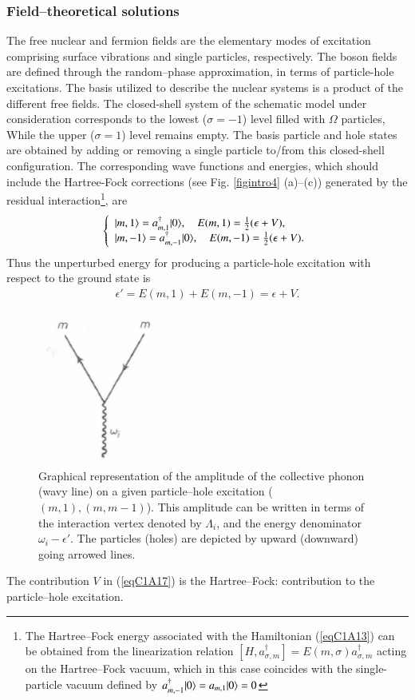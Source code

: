 \subsubsection{Field--theoretical solutions}
 The free nuclear and fermion fields are
the elementary modes of excitation comprising surface vibrations and single
particles, respectively. The boson fields are defined through the random--phase
approximation, in terms of particle-hole excitations. The basis utilized to
describe the nuclear systems is a product of the different free fields. 
The closed-shell system of the schematic model under consideration corresponds to the lowest ($\sigma = - 1$) level filled with $\Omega$ particles, While the upper
($\sigma =  1$) level remains empty. The basis particle and hole states are obtained
by adding or removing a single particle to/from this closed-shell configuration.
The corresponding wave functions and energies, which should include the
Hartree-Fock corrections (see Fig. \ref{figintro4} (a)--(c)) generated by the residual interaction\footnote{The Hartree--Fock energy associated with the Hamiltonian (\ref{eqC1A13}) can be obtained
from the linearization relation $[H,a_{\sigma,m}^\dagger]=E(m,\sigma)a^\dagger_{\sigma,m}$ acting on the Hartree--Fock
vacuum, which in this case coincides with the single-particle vacuum defined by
 $a^\dagger_{m,-1}|{0} \rangle=a_{m,1}|{0} \rangle=0$}, are
 \begin{align}\label{eqC1A17} 
\left\{\begin{array}{l}
 |{m,1} \rangle=a^\dagger_{m,1}|{0} \rangle,\quad E(m,1)=\frac{1}{2}(\epsilon+V),\\ 
|{m,-1} \rangle=a^\dagger_{m,-1}|{0} \rangle,\quad E(m,-1)=\frac{1}{2}(\epsilon+V).
\end{array} \right.
 \end{align}
Thus the unperturbed energy for producing a particle-hole excitation with
respect to the ground state is
 \begin{align}\label{eqC1A18} 
\epsilon'=E(m,1)+E(m,-1)=\epsilon+V.
 \end{align}
 \begin{figure}
 \centerline {
 \includegraphics*[width=4cm]{introduccion/figs/fig18}
 }
 \caption{Graphical representation of the amplitude of the collective phonon (wavy line) on a given particle--hole excitation ($(m,1),(m,m-1)$). This amplitude can be written in terms of the interaction vertex denoted by $\Lambda_i$, and the energy denominator $\omega_i-\epsilon'$. The particles (holes) are depicted by upward (downward) going arrowed lines.}
 \label{figC1A1}
 \end{figure}
The contribution $V$ in (\ref{eqC1A17}) is the Hartree--Fock: contribution to the particle--hole excitation.


